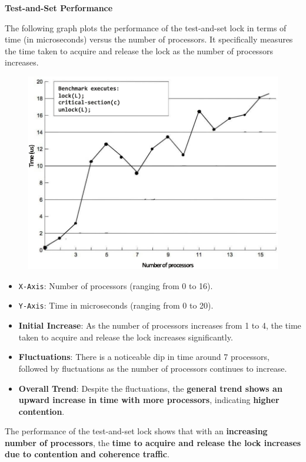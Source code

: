 \newpage

\begin{flushleft}
    \textcolor{Green3}{ \textbf{Test-and-Set Performance}}
\end{flushleft}
The following graph plots the performance of the test-and-set lock in terms of time (in microseconds) versus the number of processors. It specifically measures the time taken to acquire and release the lock as the number of processors increases.
\begin{figure}[!htp]
    \centering
    \includegraphics[width=\textwidth]{img/test-and-set-performance-1.pdf}
\end{figure}
\begin{itemize}
    \item \texttt{X-Axis}: Number of processors (ranging from 0 to 16).
    
    \item \texttt{Y-Axis}: Time in microseconds (ranging from 0 to 20).
    
    \item \textbf{Initial Increase}: As the number of processors increases from 1 to 4, the time taken to acquire and release the lock increases significantly.
    
    \item \textbf{Fluctuations}: There is a noticeable dip in time around 7 processors, followed by fluctuations as the number of processors continues to increase.
    
    \item \textbf{Overall Trend}: Despite the fluctuations, the \textbf{general trend shows an upward increase in time with more processors}, indicating \textbf{higher contention}.
\end{itemize}
The performance of the test-and-set lock shows that with an \textbf{increasing number of processors}, the \textbf{time to acquire and release the lock increases due to contention and coherence traffic}.